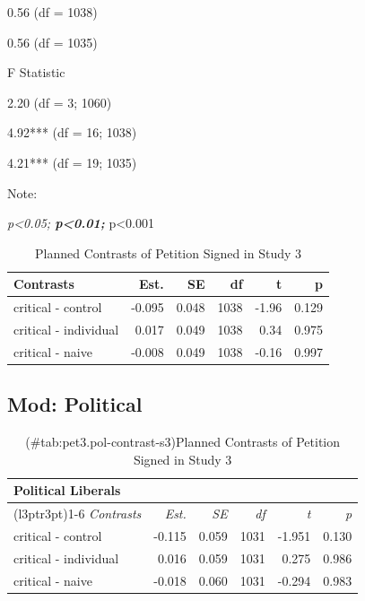 \documentclass[
]{book}
\begin{document}
0.56 (df = 1038)

0.56 (df = 1035)

F Statistic

2.20 (df = 3; 1060)

4.92*** (df = 16; 1038)

4.21*** (df = 19; 1035)

Note:

\emph{p\textless0.05; \textbf{p\textless0.01; }}p\textless0.001

\begin{table}

\caption{\label{tab:pet3-contrast-s3}Planned Contrasts of Petition Signed  in Study 3}
\centering
\begin{tabular}[t]{lrrrrr}
\toprule
Contrasts & Est. & SE & df & t & p\\
\midrule
critical - control & -0.095 & 0.048 & 1038 & -1.96 & 0.129\\
critical - individual & 0.017 & 0.049 & 1038 & 0.34 & 0.975\\
critical - naive & -0.008 & 0.049 & 1038 & -0.16 & 0.997\\
\bottomrule
\end{tabular}
\end{table}

\hypertarget{mod-political-13}{%
\subsection{Mod: Political}\label{mod-political-13}}

\begin{table}

\caption{(\#tab:pet3.pol-contrast-s3)Planned Contrasts of Petition Signed in Study 3}
\centering
\begin{tabular}[t]{lrrrrr}
\toprule
\multicolumn{6}{l}{Political Liberals} \\
\cmidrule(l{3pt}r{3pt}){1-6}
\em{Contrasts} & \em{Est.} & \em{SE} & \em{df} & \em{t} & \em{p}\\
\midrule
critical - control & -0.115 & 0.059 & 1031 & -1.951 & 0.130\\
critical - individual & 0.016 & 0.059 & 1031 & 0.275 & 0.986\\
critical - naive & -0.018 & 0.060 & 1031 & -0.294 & 0.983\\
\bottomrule
\end{tabular}
\end{table}
\end{document}
